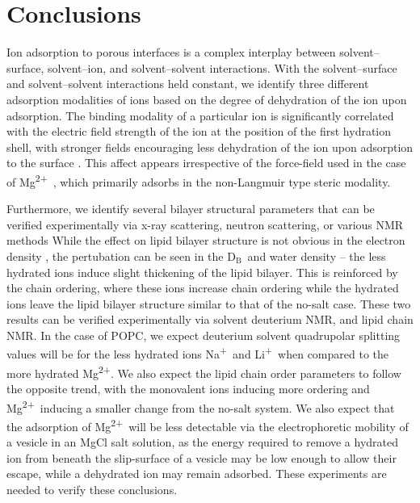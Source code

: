 \documentclass[journal=langd5,manuscript=article]{achemso}
\newcommand{\na}{Na\textsuperscript{+}~}
\newcommand{\li}{Li\textsuperscript{+}~}
\newcommand{\mg}{Mg\textsuperscript{2+}~}
\newcommand{\db}{$\text{D}_\text{B}$}
\begin{document}
\section{Conclusions}
Ion adsorption to porous interfaces is a complex interplay 
between solvent--surface, solvent--ion, and solvent--solvent
interactions. With the solvent--surface and solvent--solvent interactions 
held constant, we identify
three different adsorption modalities of ions based on the degree of 
dehydration of the ion upon adsorption. 
The binding modality of a particular ion is significantly correlated 
with the electric field strength of the ion
at the position of the first hydration shell, with stronger fields 
encouraging less dehydration of the ion upon
adsorption to the surface . This affect appears irrespective of the force-field 
used in the case
of \mg, which primarily adsorbs in the non-Langmuir type steric modality.

Furthermore, we identify several bilayer structural
parameters that can be verified experimentally via x-ray scattering, neutron
scattering,
or various NMR methods 
While the effect on lipid bilayer structure is not obvious in
the electron density , the pertubation can be seen in the \db~and water density --
the less hydrated ions induce slight thickening of the lipid bilayer. This
is reinforced by the chain ordering, where these ions increase chain ordering  
while the hydrated ions leave the lipid bilayer structure similar to that of the no-salt case.
These two results can be verified experimentally via solvent deuterium NMR, and lipid chain NMR.
In the case of POPC, we expect deuterium solvent quadrupolar splitting values will be 
for the less hydrated ions \na and \li when compared to the more hydrated Mg\textsuperscript{2+}.  
We also expect the lipid chain order parameters to follow the opposite trend,
with the monovalent ions inducing more ordering and \mg inducing a smaller change from the no-salt system.
We also expect that the adsorption of \mg will be less detectable via the 
electrophoretic mobility of a vesicle in an MgCl salt solution, as
the energy required to remove a hydrated ion from 
beneath the slip-surface of a vesicle may be low enough to allow their escape, while a dehydrated ion may remain
adsorbed.
These experiments are needed to verify
these conclusions. 
\end{document}
